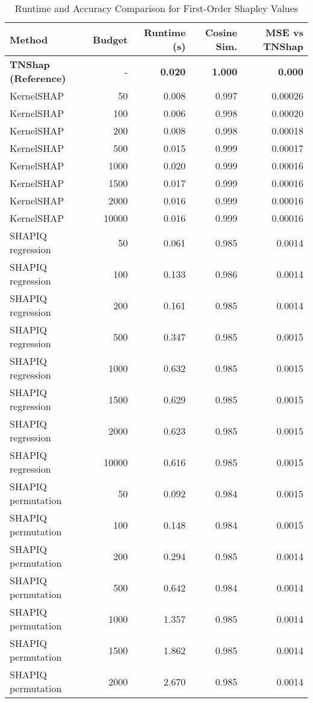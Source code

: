 \documentclass{article}
\begin{document}
\begin{table}[h!]
\centering
\caption{Runtime and Accuracy Comparison for First-Order Shapley Values}
\label{tab:order1}
\small
\begin{tabular}{lrrrr}
\toprule
\textbf{Method} & \textbf{Budget} & \textbf{Runtime (s)} & \textbf{Cosine Sim.} & \textbf{MSE vs TNShap} \\
\midrule
\rowcolor{green!10}
\textbf{TNShap (Reference)} & - & \textbf{0.020} & \textbf{1.000} & \textbf{0.000} \\
\midrule
KernelSHAP & 50 & 0.008 & 0.997 & 0.00026 \\
KernelSHAP & 100 & 0.006 & 0.998 & 0.00020 \\
KernelSHAP & 200 & 0.008 & 0.998 & 0.00018 \\
KernelSHAP & 500 & 0.015 & 0.999 & 0.00017 \\
KernelSHAP & 1000 & 0.020 & 0.999 & 0.00016 \\
KernelSHAP & 1500 & 0.017 & 0.999 & 0.00016 \\
KernelSHAP & 2000 & 0.016 & 0.999 & 0.00016 \\
KernelSHAP & 10000 & 0.016 & 0.999 & 0.00016 \\
\midrule
SHAPIQ regression & 50 & 0.061 & 0.985 & 0.0014 \\
SHAPIQ regression & 100 & 0.133 & 0.986 & 0.0014 \\
SHAPIQ regression & 200 & 0.161 & 0.985 & 0.0014 \\
SHAPIQ regression & 500 & 0.347 & 0.985 & 0.0015 \\
SHAPIQ regression & 1000 & 0.632 & 0.985 & 0.0015 \\
SHAPIQ regression & 1500 & 0.629 & 0.985 & 0.0015 \\
SHAPIQ regression & 2000 & 0.623 & 0.985 & 0.0015 \\
SHAPIQ regression & 10000 & 0.616 & 0.985 & 0.0015 \\
\midrule
SHAPIQ permutation & 50 & 0.092 & 0.984 & 0.0015 \\
SHAPIQ permutation & 100 & 0.148 & 0.984 & 0.0015 \\
SHAPIQ permutation & 200 & 0.294 & 0.985 & 0.0014 \\
SHAPIQ permutation & 500 & 0.642 & 0.984 & 0.0014 \\
SHAPIQ permutation & 1000 & 1.357 & 0.985 & 0.0014 \\
SHAPIQ permutation & 1500 & 1.862 & 0.985 & 0.0014 \\
SHAPIQ permutation & 2000 & 2.670 & 0.985 & 0.0014 \\

\end{tabular}
\end{table}
\end{document}
